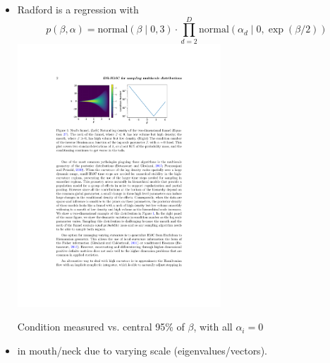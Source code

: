 \documentclass[10pt]{report}
\begin{document}
\begin{itemize}
\item Radford  is a  regression with 
  $$\textstyle
  p(\beta, \alpha) = \textrm{normal}(\beta \mid 0, 3) \cdot \prod_{d=2}^D \textrm{normal}(\alpha_d \mid 0, \exp(\beta / 2))
  $$
  \includegraphics[width=0.6\textwidth]{funnel-condition.pdf}
  \quad 
  \begin{minipage}[t]{1in}
    \vspace*{-1in}
    \small Condition measured vs. central 95\% of $\beta$, with all $\alpha_i = 0$
  \end{minipage}

\item {} in mouth/neck due to varying scale (eigenvalues/vectors).
\end{itemize}
  
\end{document}

